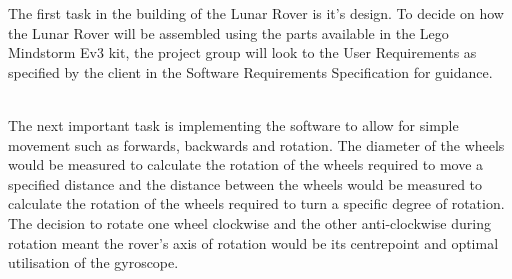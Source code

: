 \documentclass{article}
\newcounter{subsubsubsection}[subsubsection]
\begin{document}
    \begin{adjustwidth}{3em}{0pt}
    	The first task in the building of the Lunar Rover is it's design. To decide on how the Lunar Rover will be assembled using the parts available in the Lego Mindstorm Ev3 kit, the project group will look to the User Requirements as specified by the client in the Software Requirements Specification for guidance.\\\\
        \begin{comment}
The touch sensors would be placed on either side of the front to prevent collision during forward movement. The ultrasonic placed in the front centre to detect, prepare for and map obstacles in the distance. The gyroscope placed in the centre between the wheels to accurately detect the Rover's rotation. The colour sensor placed beneath the ultrasonic facing downwards close to the surface to accurately detect and map features of the surface. And most importantly each motor would control and individual wheel to allow for not just forward and backward movement but also rotation. 
\end{comment}
	\end{adjustwidth}

        \begin{adjustwidth}{3em}{0pt}
    	The next important task is implementing the software to allow for simple movement such as forwards, backwards and rotation. The diameter of the wheels would be measured to calculate the rotation of the wheels required to move a specified distance and the distance between the wheels would be measured to calculate the rotation of the wheels required to turn a specific degree of rotation. The decision to rotate one wheel clockwise and the other anti-clockwise during rotation meant the rover's axis of rotation would be its centrepoint and optimal utilisation of the gyroscope.
	\end{adjustwidth}
    
\end{document}
